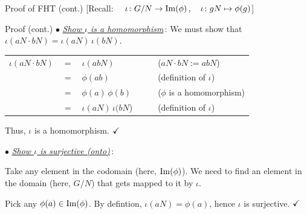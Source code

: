 \documentclass[8pt]{beamer}
\newcommand{\Pause}{}      %
\begin{document}
\begin{frame}{Proof of FHT (cont.) [{\small Recall: 
    $\quad \iota\colon G/N\rightarrow\operatorname{Im}(\phi)\,,\quad\iota\colon 
    gN\mapsto\phi(g)$}]} 

  \begin{exampleblock}{Proof (cont.)}
    $\bullet$ \underline{\emph{Show $\iota$ is a homomorphism}}\,: \Pause We must
    show that $\iota(aN\cdot bN)=\iota(aN)\,\iota(bN)$. 
    
    \medskip\Pause
    
    \begin{center}\renewcommand{\arraystretch}{1.2}
      \begin{tabular}{rcllll}
        $\iota(aN\cdot bN)$ & $=$ & $\iota(abN)$ &&&($aN\cdot bN:=abN$)\Pause
        \\  
        & $=$ & $\phi(ab)$ &&& (definition of $\iota$) \Pause \\
        & $=$ & $\phi(a)\,\phi(b)$&&& ($\phi$ is a homomorphism)\Pause\\
        & $=$ & $\iota(aN)\,\iota(bN$) &&& (definition of $\iota$)
      \end{tabular}
    \end{center}
    
    \Pause Thus, $\iota$ is a homomorphism. $\hfill\checkmark$ 
    
    \bigskip\Pause
    
    \pause $\bullet$ \underline{\emph{Show $\iota$ is surjective (onto)}}\,:
    
    \medskip\Pause
    
    Take any element in the codomain (here, $\operatorname{Im}(\phi)$). \Pause We need to
    find an element in the domain (here, $G/N$) that gets mapped to it
    by $\iota$.
    
    \Pause\bigskip
    
    Pick any $\phi(a)\in\operatorname{Im}(\phi)$. \Pause By defintion, $\iota(aN)=\phi(a)$,
    hence $\iota$ is surjective. $\hfill\checkmark$ 
    
  \end{exampleblock}
  
\end{frame}

\end{document}
